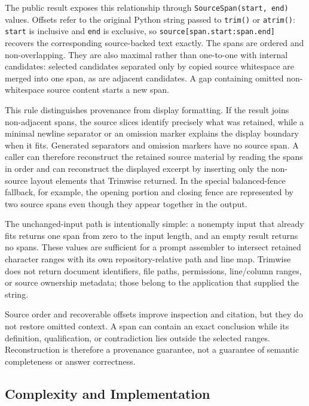\documentclass[
]{article}
\newcounter{none} %
\begin{document}
The public result exposes this relationship through
\texttt{SourceSpan(start,\ end)} values. Offsets refer to the original
Python string passed to \texttt{trim()} or \texttt{atrim()}:
\texttt{start} is inclusive and \texttt{end} is exclusive, so
\texttt{source{[}span.start:span.end{]}} recovers the corresponding
source-backed text exactly. The spans are ordered and non-overlapping.
They are also maximal rather than one-to-one with internal candidates:
selected candidates separated only by copied source whitespace are
merged into one span, as are adjacent candidates. A gap containing
omitted non-whitespace source content starts a new span.

This rule distinguishes provenance from display formatting. If the
result joins non-adjacent spans, the source slices identify precisely
what was retained, while a minimal newline separator or an omission
marker explains the display boundary when it fits. Generated separators
and omission markers have no source span. A caller can therefore
reconstruct the retained source material by reading the spans in order
and can reconstruct the displayed excerpt by inserting only the
non-source layout elements that Trimwise returned. In the special
balanced-fence fallback, for example, the opening portion and closing
fence are represented by two source spans even though they appear
together in the output.

The unchanged-input path is intentionally simple: a nonempty input that
already fits returns one span from zero to the input length, and an
empty result returns no spans. These values are sufficient for a prompt
assembler to intersect retained character ranges with its own
repository-relative path and line map. Trimwise does not return document
identifiers, file paths, permissions, line/column ranges, or source
ownership metadata; those belong to the application that supplied the
string.

Source order and recoverable offsets improve inspection and citation,
but they do not restore omitted context. A span can contain an exact
conclusion while its definition, qualification, or contradiction lies
outside the selected ranges. Reconstruction is therefore a provenance
guarantee, not a guarantee of semantic completeness or answer
correctness.

\subsection{Complexity and
Implementation}\label{complexity-and-implementation}
\end{document}
